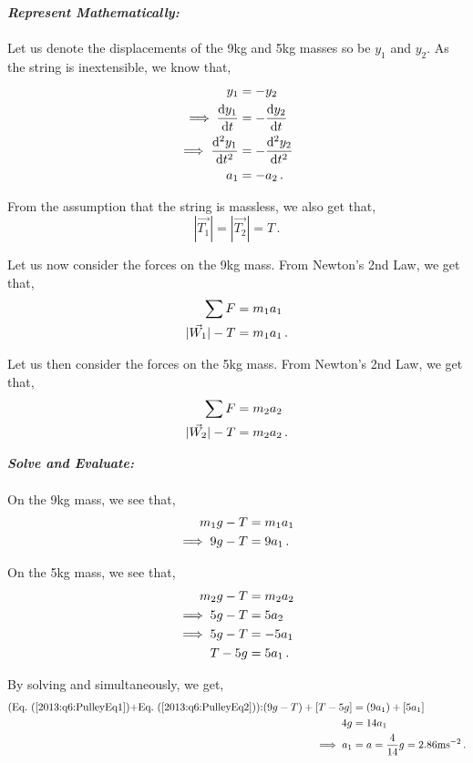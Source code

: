 \begin{subquestions}
\begin{subsubquestions}
\textbf{\textit{Represent Mathematically:}} \\ \\ 
Let us denote the displacements of the 9kg and 5kg masses so be $y_1$ and $y_2$. As the string is inextensible, we know that,
\begin{align}
	y_1 & = -y_2 \nonumber \\
	\implies \frac{\mathrm{d}y_1}{\mathrm{d}t} & = -\frac{\mathrm{d}y_2}{\mathrm{d}t} \nonumber \\
	\implies \frac{\mathrm{d}^2y_1}{\mathrm{d}t^2} & = -\frac{\mathrm{d}^2y_2}{\mathrm{d}t^2} \nonumber \\
	a_1 & = -a_2 \,.
\end{align}

From the assumption that the string is massless, we also get that,
\begin{equation}
	|\vec{T_1}| = |\vec{T_2}| = T \,.
\end{equation}

Let us now consider the forces on the 9kg mass. From Newton's 2nd Law, we get that,
\begin{align}
	\sum F & = m_1a_1 \nonumber \\
	|\vec{W_1}| - T & = m_1a_1 \,.
\end{align}

Let us then consider the forces on the 5kg mass. From Newton's 2nd Law, we get that,
\begin{align}
	\sum F & = m_2a_2 \nonumber \\
	|\vec{W_2}|-T & = m_2a_2 \,.
\end{align}




\textbf{\textit{Solve and Evaluate:}} \\ \\
On the 9kg mass, we see that,
\begin{align}
	m_1g - T & = m_1a_1 \nonumber \\
	\implies 9g-T & = 9a_1 \,. \label{2013:q6:PulleyEq1}
\end{align}

On the 5kg mass, we see that,
\begin{align}
	m_2g - T & = m_2a_2 \nonumber \\
	\implies 5g-T & = 5a_2 \nonumber \\
	\implies 5g-T & = -5a_1 \nonumber \\
	T-5g & = 5a_1 \,. \label{2013:q6:PulleyEq2}
\end{align}

By solving  and  simultaneously, we get,
\begin{align}
	\text{(\req{2013:q6:PulleyEq1}+\req{2013:q6:PulleyEq2}):} (9g-T)+[T-5g] & = (9a_1)+[5a_1] \nn \\
	4g & = 14a_1 \nn \\
	\implies a_1 & = a = \frac{4}{14}g = 2.86\text{ms}^{-2} \,.
\end{align}


\end{subsubquestions}
\end{subquestions}
